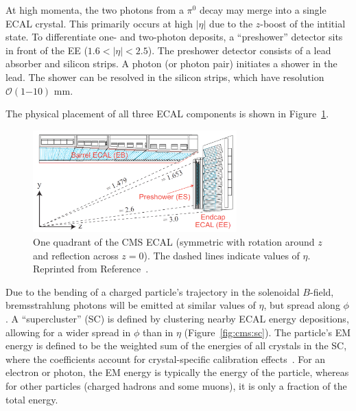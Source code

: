At high momenta, the two photons from a $\pi^0$ decay may merge into a single ECAL crystal. 
This primarily occurs at high $|\eta|$ due to the $z$-boost of the intitial state.
To differentiate one- and two-photon deposits, a ``preshower'' detector sits in front of the EE ($1.6 < |\eta|<2.5$).
The preshower detector consists of a lead absorber and silicon strips.
A photon (or photon pair) initiates a shower in the lead.
The shower can be resolved in the silicon strips, which have resolution $\mathcal{O}(1\mathrm{-}10)$ mm.

The physical placement of all three ECAL components is shown in Figure~\ref{fig:cms:ecal}.

\begin{figure}[]
    \begin{center} 
        \includegraphics[width=0.7\textwidth]{figures/cms/ecal.png}
        \caption{One quadrant of the CMS ECAL (symmetric with rotation around $z$ and reflection across $z=0$).
                 The dashed lines indicate values of $\eta$.
                 Reprinted from Reference~\cite{cmsecaljinst}.}
        \label{fig:cms:ecal}
    \end{center}
\end{figure}

Due to the bending of a charged particle's trajectory in the solenoidal $B$-field, bremsstrahlung photons will be emitted at similar values of $\eta$, but spread along $\phi$.
A ``supercluster'' (SC) is defined by clustering nearby ECAL energy depositions, allowing for a wider spread in $\phi$ than in $\eta$ (Figure~\ref{fig:cms:sc}).
The particle's EM energy is defined to be the weighted sum of the energies of all crystals in the SC, where the coefficients account for crystal-specific calibration effects~\cite{cmsecalreco}.
For an electron or photon, the EM energy is typically the energy of the particle, whereas for other particles (charged hadrons and some muons), it is only a fraction of the total energy.

